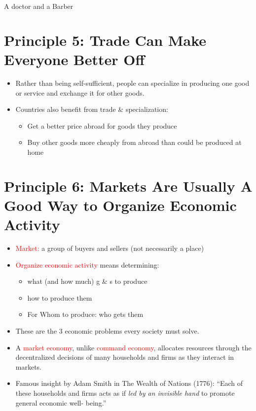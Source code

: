 \documentclass[
]{book}
\providecommand{\tightlist}{%
  \setlength{\itemsep}{0pt}\setlength{\parskip}{0pt}}
\begin{document}
A doctor and a Barber

\hypertarget{principle-5-trade-can-make-everyone-better-off}{%
\section{Principle 5: Trade Can Make Everyone Better Off}\label{principle-5-trade-can-make-everyone-better-off}}

\begin{itemize}
\item
  Rather than being self-sufficient, people can specialize in producing one good or service and exchange it for other goods.
\item
  Countries also benefit from trade \& specialization:

  \begin{itemize}
  \tightlist
  \item
    Get a better price abroad for goods they produce
  \item
    Buy other goods more cheaply from abroad than could be produced at home
  \end{itemize}
\end{itemize}

\hypertarget{principle-6-markets-are-usually-a-good-way-to-organize-economic-activity}{%
\section{Principle 6: Markets Are Usually A Good Way to Organize Economic Activity}\label{principle-6-markets-are-usually-a-good-way-to-organize-economic-activity}}

\begin{itemize}
\item
  \textcolor{red}{ Market:} a group of buyers and sellers (not necessarily a place)
\item
  \textcolor{red}{Organize economic activity} means determining:

  \begin{itemize}
  \tightlist
  \item
    what (and how much) g \& s to produce
  \item
    how to produce them\\
  \item
    For Whom to produce: who gets them
  \end{itemize}
\item
  These are the 3 economic problems every society must solve.
\item
  A \textcolor{red}{market economy}, unlike \textcolor{red}{command economy}, allocates resources through the decentralized decisions of many households and firms as they interact in markets.
\item
  Famous insight by Adam Smith in The Wealth of Nations (1776): ``Each of these households and firms acts as if \emph{led by an invisible hand} to promote general economic well- being.''
\end{itemize}
\end{document}
